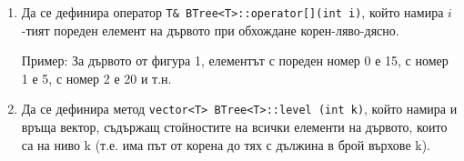 \documentclass[12pt,a4paper]{article}
\begin{document}
\begin{enumerate}
	\item Да се дефинира оператор \texttt{T\& BTree<T>::operator[](int i)}, който намира $i$-тият пореден елемент на дървото при обхождане корен-ляво-дясно. 

	Пример: За дървото от фигура 1, елементът с пореден номер 0 е 15, с номер 1 е 5, с номер 2 е 20 и т.н.

	\item Да се дефинира метод \texttt{vector<T> BTree<T>::level (int k)}, който намира и връща вектор, съдържащ стойностите на всички елементи на дървото, които са на ниво k (т.е. има път от корена до тях с дължина в брой върхове k).









\end{enumerate}
\end{document}

